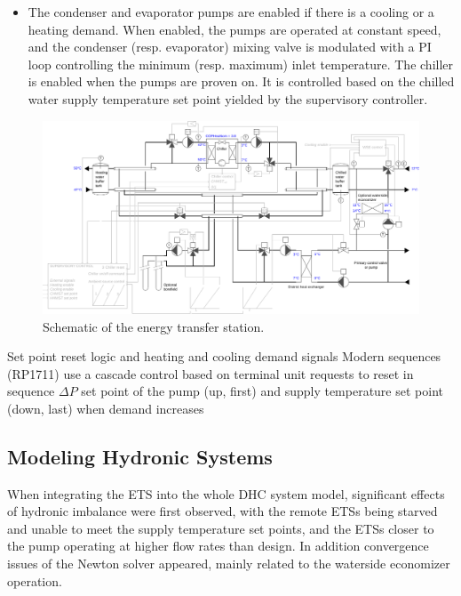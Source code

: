 \begin{itemize}
    \item The condenser and evaporator pumps are enabled if there is a cooling or a heating demand. When enabled, the pumps are operated at constant speed, and the condenser (resp. evaporator) mixing valve is modulated with a PI loop controlling the minimum (resp. maximum) inlet temperature. The chiller is enabled when the pumps are proven on. It is controlled based on the chilled water supply temperature set point yielded by the supervisory controller.
\end{itemize}

\begin{figure}[h!]
\centering
\includegraphics[width=\linewidth]{figures/ChillerBorefield.pdf}
\caption{Schematic of the energy transfer station.}
\label{fig:schematic}
\end{figure}

Set point reset logic and heating and cooling demand signals
Modern sequences (RP1711) use a cascade control based on terminal unit requests to reset in sequence \(\Delta P\) set point of the pump (up, first) and supply temperature set point (down, last) when demand increases





\subsection{Modeling Hydronic Systems} \label{sec:balancing}

When integrating the ETS into the whole DHC system model, significant effects of hydronic imbalance were first observed, with the remote ETSs being starved and unable to meet the supply temperature set points, and the ETSs closer to the pump operating at higher flow rates than design.
In addition convergence issues of the Newton solver appeared, mainly related to the waterside economizer operation.

